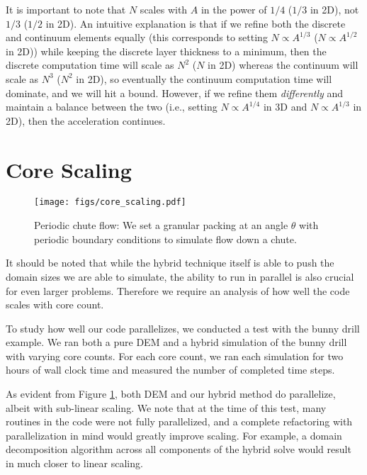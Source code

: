 It is important to note that $N$ scales with $A$ in the power of $1/4$ ($1/3$ in 2D), not $1/3$ ($1/2$ in 2D).
An intuitive explanation is that if we refine both the discrete and continuum elements equally (this corresponds to setting $N \propto A^{1/3}$ ($N \propto A^{1/2}$ in 2D)) while keeping the discrete layer thickness to a minimum,
then the discrete computation time will scale as $N^2$ ($N$ in 2D) whereas the
continuum will scale as $N^3$ ($N^2$ in 2D), so eventually the continuum computation time will dominate, and we
will hit a bound. However, if we refine them \textit{differently} and maintain a balance between the two (i.e., setting $N \propto A^{1/4}$ in 3D and $N \propto A^{1/3}$ in 2D),
then the acceleration continues.

\section{Core Scaling}
\begin{figure}
  \centering
  \texttt{[image: figs/core\_scaling.pdf]}
  \caption{
    Periodic chute flow: We set a granular packing at an angle $\theta$ with periodic boundary conditions to simulate flow down a chute.
  }
  \label{fig:hybrid:chute_flow}
\end{figure}


It should be noted that while the hybrid technique itself is able to push the domain sizes we are able to simulate, the ability to run in parallel is also crucial for even larger problems. Therefore we require an analysis of how well the code scales with core count.

To study how well our code parallelizes, we conducted a test with the bunny drill example. We ran both a pure DEM and a hybrid simulation of the bunny drill with varying core counts. For each core count, we ran each simulation for two hours of wall clock time and measured the number of completed time steps. 

As evident from Figure \ref{fig:hybrid:chute_flow}, both DEM and our hybrid method do parallelize, albeit with sub-linear scaling. We note that at the time of this test, many routines in the code were not fully parallelized, and a complete refactoring with parallelization in mind would greatly improve scaling. For example, a domain decomposition algorithm across all components of the hybrid solve would result in much closer to linear scaling.




